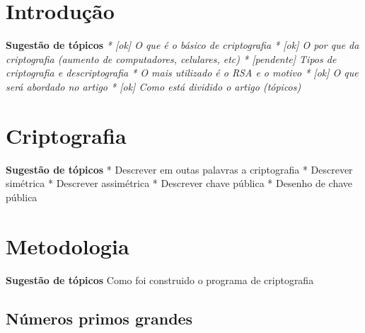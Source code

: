 \documentclass[12pt]{article}
\begin{document}
 
\maketitle




\section{Introdução}

    \textbf{Sugestão de tópicos}
    \newline
    \textit{
    * [ok] O que é o básico de criptografia \newline
    * [ok] O por que da criptografia (aumento de computadores, celulares, etc)\newline
    * [pendente] Tipos de criptografia e descriptografia \newline
    * O mais utilizado é o RSA e o motivo \newline
    * [ok] O que será abordado no artigo \newline
    * [ok] Como está dividido o artigo (tópicos) \newline
    }



\section{Criptografia} \label{sec:firstpage}

    \textbf{Sugestão de tópicos}
    \newline
    * Descrever em outas palavras a criptografia \newline
    * Descrever simétrica  \newline
    * Descrever assimétrica \newline
    * Descrever chave pública \newline
    * Desenho de chave pública \newline



\section{Metodologia}

    \textbf{Sugestão de tópicos}
    \newline
    Como foi construido o programa de criptografia

\subsection{Números primos grandes}
\end{document}
